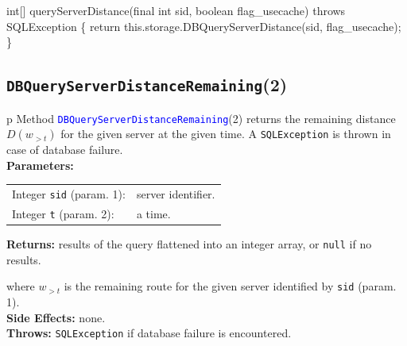int[] queryServerDistance(final int sid, boolean flag_usecache) throws SQLException \{
  return this.storage.DBQueryServerDistance(sid, flag_usecache);
\}
\eatline
{}\nwendcode{}\nwdocspar
\subsection{\texttt{DBQueryServerDistanceRemaining}(2)}
\begin{tabular}{p{\textwidth}}
\toprule
{}
Method \textcolor{blue}{{\tt{}\protect{}DBQueryServerDistanceRemaining}}(2) returns the
remaining distance $D(w_{>t})$ for the given server at the given time.
A {\tt{}SQLException} is thrown in case of database failure.\\
\midrule
\textbf{Parameters:} \\
\begin{tabular}{lp{116mm}}
Integer {\tt{}sid} (param. 1):&server identifier.\\
Integer {\tt{}t} (param. 2):&a time.\\
\end{tabular}
\textbf{Returns:} results of the query flattened into an integer array,
or {\tt{}null} if no results.


where $w_{>t}$ is the remaining route for the given server identified by {\tt{}sid} (param. 1).\\
\textbf{Side Effects:} none.\\
\textbf{Throws:} {\tt{}SQLException} if database failure is encountered.\\
\bottomrule
\end{tabular}
\nwenddocs{}\endmoddef{}
